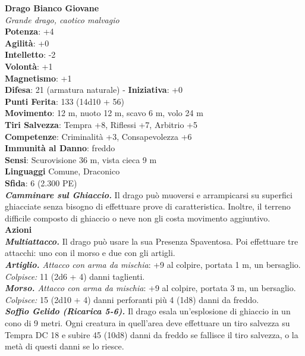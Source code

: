 \begin{multicols}{2}
\medskip\textbf{Drago Bianco Giovane}\\
\emph{Grande drago, caotico malvagio} \\
\textbf{Potenza}: +4 \\
\textbf{Agilità}: +0 \\
\textbf{Intelletto}: -2\\
\textbf{Volontà}: +1\\
\textbf{Magnetismo}: +1\\
\textbf{Difesa}: 21 (armatura naturale) - \textbf{Iniziativa}: +0\\
\textbf{Punti Ferita}: 133 (14d10 + 56)\\
\textbf{Movimento}: 12 m, nuoto 12 m, scavo 6 m, volo 24 m\\
\textbf{Tiri Salvezza}: Tempra +8, Riflessi +7, Arbitrio +5\\
\textbf{Competenze}: Criminalità +3, Consapevolezza +6\\
\textbf{Immunità al Danno}: freddo\\
\textbf{Sensi}: Scurovisione 36 m, vista cieca 9 m\\
\textbf{Linguaggi} Comune, Draconico\\
\textbf{Sfida}: 6 (2.300 PE)\smallskip\\
\emph{\textbf{Camminare sul Ghiaccio.}} Il drago può muoversi e arrampicarsi su superfici ghiacciate senza bisogno di effettuare prove di caratteristica. Inoltre, il terreno difficile composto di ghiaccio o neve non gli costa movimento aggiuntivo.\\
\smallskip\textbf{Azioni}\\
\emph{\textbf{Multiattacco.}} Il drago può usare la sua Presenza Spaventosa. Poi effettuare tre attacchi: uno con il morso e due con gli artigli.\\
\emph{\textbf{Artiglio.} Attacco con arma da mischia}: +9 al colpire, portata 1 m, un bersaglio.\\
\emph{Colpisce:} 11 (2d6 + 4) danni taglienti.\\
\emph{\textbf{Morso.} Attacco con arma da mischia}: +9 al colpire, portata 3 m, un bersaglio.\\
\emph{Colpisce:} 15 (2d10 + 4) danni perforanti più 4 (1d8) danni da freddo.\\
\emph{\textbf{Soffio Gelido (Ricarica 5-6).}} Il drago esala un'esplosione di ghiaccio in un cono di 9 metri. Ogni creatura in quell'area deve effettuare un tiro salvezza su Tempra DC  18 e subire 45 (10d8) danni da freddo se fallisce il tiro salvezza, o la metà di questi danni se lo riesce.\\

\end{multicols}

